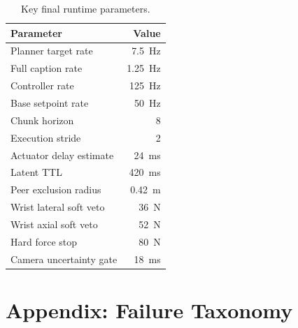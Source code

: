 \documentclass[10pt,twocolumn]{article}
\begin{document}
\begin{table}[h]
\centering
\caption{Key final runtime parameters.}
\begin{tabular}{lr}
\toprule
Parameter & Value \\
\midrule
Planner target rate & \SI{7.5}{Hz} \\
Full caption rate & \SI{1.25}{Hz} \\
Controller rate & \SI{125}{Hz} \\
Base setpoint rate & \SI{50}{Hz} \\
Chunk horizon & 8 \\
Execution stride & 2 \\
Actuator delay estimate & \SI{24}{ms} \\
Latent TTL & \SI{420}{ms} \\
Peer exclusion radius & \SI{0.42}{m} \\
Wrist lateral soft veto & \SI{36}{N} \\
Wrist axial soft veto & \SI{52}{N} \\
Hard force stop & \SI{80}{N} \\
Camera uncertainty gate & \SI{18}{ms} \\
\bottomrule
\end{tabular}
\end{table}

\section{Appendix: Failure Taxonomy}
\end{document}
